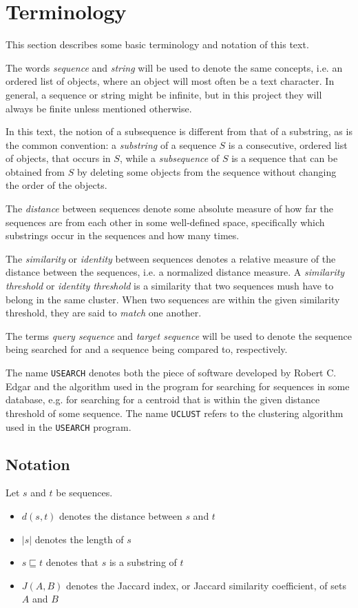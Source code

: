 \section{Terminology}
This section describes some basic terminology and notation of this text.

The words \emph{sequence} and \emph{string} will be used to denote the same
concepts, i.e. an ordered list of objects, where an object will most often be a
text character. In general, a sequence or string might be infinite, but in this
project they will always be finite unless mentioned otherwise.

In this text, the notion of a subsequence is different from that of a
substring, as is the common convention: a \emph{substring} of a sequence $S$ is
a consecutive, ordered list of objects, that occurs in $S$, while a
\emph{subsequence} of $S$ is a sequence that can be obtained from $S$ by
deleting some objects from the sequence without changing the order of the
objects.

The \emph{distance} between sequences denote some absolute measure of how far
the sequences are from each other in some well-defined space, specifically
which substrings occur in the sequences and how many times.

The \emph{similarity} or \emph{identity} between sequences denotes a relative
measure of the distance between the sequences, i.e. a normalized distance
measure. A \emph{similarity threshold} or \emph{identity threshold} is a
similarity that two sequences mush have to belong in the same cluster.  When
two sequences are within the given similarity threshold, they are said to
\emph{match} one another.

The terms \emph{query sequence} and \emph{target sequence} will be used to
denote the sequence being searched for and a sequence being compared to,
respectively.

The name \texttt{USEARCH} denotes both the piece of software developed by
Robert C. Edgar and the algorithm used in the program for searching for
sequences in some database, e.g. for searching for a centroid that is within
the given distance threshold of some sequence. The name \texttt{UCLUST} refers
to the clustering algorithm used in the \texttt{USEARCH} program.


\subsection{Notation}
Let $s$ and $t$ be sequences.
\begin{itemize}
  \item $d(s,t)$ denotes the distance between $s$ and $t$
  \item $|s|$ denotes the length of $s$
  \item $s \sqsubseteq t$ denotes that $s$ is a substring of $t$
  \item $J(A,B)$ denotes the Jaccard index, or Jaccard similarity coefficient,
    of sets $A$ and $B$
\end{itemize}
